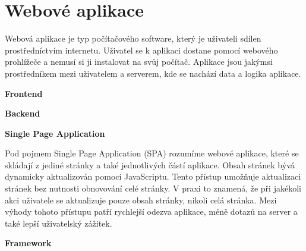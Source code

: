 \section{Webové aplikace}

Webová aplikace je typ počítačového software, který je uživateli sdílen prostředníctvím internetu. 
Uživatel se k aplikaci dostane pomocí webového prohlížeče a nemusí si ji instalovat na svůj počítač. 
Aplikace jsou jakýmsi prostředníkem mezi uživatelem a serverem, kde se nachází data a logika aplikace.\cite{codeacademywebapp}

\begin{flushleft}
  \textbf{Frontend}
\end{flushleft}


\begin{flushleft}
  \textbf{Backend}
\end{flushleft}


\begin{flushleft}
  \textbf{Single Page Application}
\end{flushleft}

Pod pojmem Single Page Application (SPA) rozumíme webové aplikace, které se skládají z jediné stránky a také jednotlivých částí aplikace. 
Obsah stránek bývá dynamicky aktualizován pomocí JavaScriptu. Tento přístup umožňuje aktualizaci stránek bez nutnosti obnovování celé stránky. 
V praxi to znamená, že při jakékoli akci uživatele se aktualizuje pouze obsah stránky, nikoli celá stránka. 
Mezi výhody tohoto přístupu patří rychlejší odezva aplikace, méně dotazů na server a také lepší uživatelský zážitek.\cite{spausingangularjs}

\begin{flushleft}
  \textbf{Framework}
\end{flushleft}

